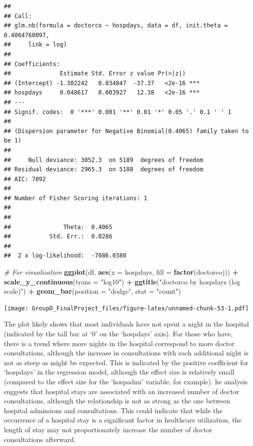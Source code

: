 \documentclass[
]{article}
\newenvironment{Shaded}{\begin{snugshade}}{\end{snugshade}}
\newcommand{\AttributeTok}[1]{\textcolor[rgb]{0.13,0.29,0.53}{#1}}
\newcommand{\CommentTok}[1]{\textcolor[rgb]{0.56,0.35,0.01}{\textit{#1}}}
\newcommand{\FunctionTok}[1]{\textcolor[rgb]{0.13,0.29,0.53}{\textbf{#1}}}
\newcommand{\NormalTok}[1]{#1}
\newcommand{\SpecialCharTok}[1]{\textcolor[rgb]{0.81,0.36,0.00}{\textbf{#1}}}
\newcommand{\StringTok}[1]{\textcolor[rgb]{0.31,0.60,0.02}{#1}}
\begin{document}
\begin{verbatim}
## 
## Call:
## glm.nb(formula = doctorco ~ hospdays, data = df, init.theta = 0.4064760097, 
##     link = log)
## 
## Coefficients:
##              Estimate Std. Error z value Pr(>|z|)    
## (Intercept) -1.302242   0.034847  -37.37   <2e-16 ***
## hospdays     0.048617   0.003927   12.38   <2e-16 ***
## ---
## Signif. codes:  0 '***' 0.001 '**' 0.01 '*' 0.05 '.' 0.1 ' ' 1
## 
## (Dispersion parameter for Negative Binomial(0.4065) family taken to be 1)
## 
##     Null deviance: 3052.3  on 5189  degrees of freedom
## Residual deviance: 2965.3  on 5188  degrees of freedom
## AIC: 7092
## 
## Number of Fisher Scoring iterations: 1
## 
## 
##               Theta:  0.4065 
##           Std. Err.:  0.0286 
## 
##  2 x log-likelihood:  -7086.0380
\end{verbatim}

\begin{Shaded}
\begin{Highlighting}[]
\CommentTok{\# For visualization}
\FunctionTok{ggplot}\NormalTok{(df, }\FunctionTok{aes}\NormalTok{(}\AttributeTok{x =}\NormalTok{ hospdays, }\AttributeTok{fill =} \FunctionTok{factor}\NormalTok{(doctorco))) }\SpecialCharTok{+} 
  \FunctionTok{scale\_y\_continuous}\NormalTok{(}\AttributeTok{trans =} \StringTok{"log10"}\NormalTok{) }\SpecialCharTok{+}
  \FunctionTok{ggtitle}\NormalTok{(}\StringTok{"\textquotesingle{}doctorco\textquotesingle{} by \textquotesingle{}hospdays\textquotesingle{} (log scale)"}\NormalTok{) }\SpecialCharTok{+}
  \FunctionTok{geom\_bar}\NormalTok{(}\AttributeTok{position =} \StringTok{"dodge"}\NormalTok{, }\AttributeTok{stat =} \StringTok{"count"}\NormalTok{)}
\end{Highlighting}
\end{Shaded}

\texttt{[image: GroupO\_FinalProject\_files/figure-latex/unnamed-chunk-53-1.pdf]}

The plot likely shows that most individuals have not spent a night in
the hospital (indicated by the tall bar at `0' on the `hospdays' axis).
For those who have, there is a trend where more nights in the hospital
correspond to more doctor consultations, although the increase in
consultations with each additional night is not as steep as might be
expected. This is indicated by the positive coefficient for `hospdays'
in the regression model, although the effect size is relatively small
(compared to the effect size for the `hospadmi' variable, for example).
he analysis suggests that hospital stays are associated with an
increased number of doctor consultations, although the relationship is
not as strong as the one between hospital admissions and consultations.
This could indicate that while the occurrence of a hospital stay is a
significant factor in healthcare utilization, the length of stay may not
proportionately increase the number of doctor consultations afterward.
\end{document}
